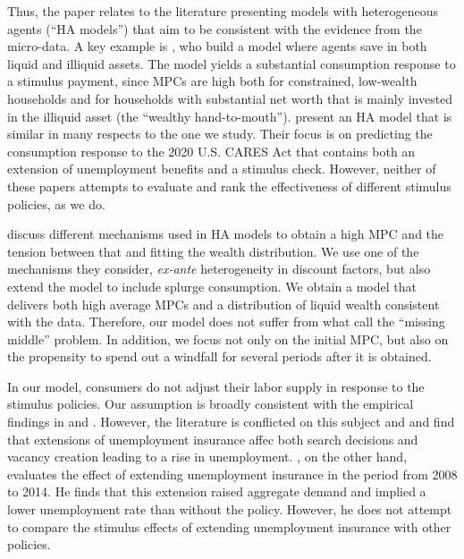 \documentclass[\econtexRoot/HAFiscal]{subfiles}
\begin{document}
Thus, the paper relates to the literature presenting models with heterogeneous agents (``HA models'') that aim to be consistent with the evidence from the micro-data. A key example is \cite{kaplan2014model}, who build a model where agents save in both liquid and illiquid assets. The model yields a substantial consumption response to a stimulus payment, since MPCs are high both for constrained, low-wealth households and for households with substantial net worth that is mainly invested in the illiquid asset (the ``wealthy hand-to-mouth''). \cite{carroll2020modeling} present an HA model that is similar in many respects to the one we study. Their focus is on predicting the consumption response to the 2020 U.S. CARES Act that contains both an extension of unemployment benefits and a stimulus check. However, neither of these papers attempts to evaluate and rank the effectiveness of different stimulus policies, as we do.

\cite{kaplanMPC2022} discuss different mechanisms used in HA models to obtain a high MPC and the tension between that and fitting the wealth distribution. We use one of the mechanisms they consider, \textit{ex-ante} heterogeneity in discount factors, but also extend the model to include splurge consumption. We obtain a model that delivers both high average MPCs and a distribution of liquid wealth consistent with the data. Therefore, our model does not suffer from what \cite{kaplanMPC2022} call the ``missing middle'' problem. In addition, we focus not only on the initial MPC, but also on the propensity to spend out a windfall for several periods after it is obtained. 

In our model, consumers do not adjust their labor supply in response to the stimulus policies.  Our assumption is broadly consistent with the empirical findings in \cite{ganong2022spending} and \cite{chodorow2016limited}. However, the literature is conflicted on this subject and \cite{hagedorn2017impact} and \cite{hagedorn2019unemployment} find that extensions of unemployment insurance affec both search decisions and vacancy creation leading to a rise in unemployment. \cite{kekre2022unemp}, on the other hand, evaluates the effect of extending unemployment insurance in the period from 2008 to 2014. He finds that this extension raised aggregate demand and implied a lower unemployment rate than without the policy. However, he does not attempt to compare the stimulus effects of extending unemployment insurance with other policies.
\end{document}
